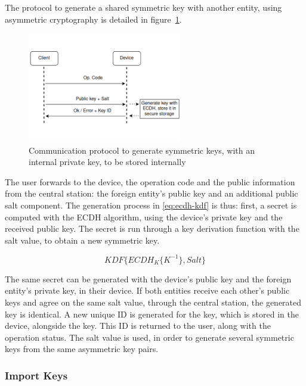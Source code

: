 The protocol to generate a shared symmetric key with another entity, using asymmetric cryptography is detailed in figure~\ref{fig:protocol:ecdh}.
\begin{figure}[h!]
	\centering
	\includegraphics[width=0.60\textwidth]{./Images/ecdh.png}
	\caption{Communication protocol to generate symmetric keys, with an internal private key, to be stored internally}
	\label{fig:protocol:ecdh}
\end{figure}

The user forwards to the device, the operation code and the public information from the central station: the foreign entity's public key and an additional public salt component.
The generation process in \ref{eq:ecdh-kdf} is thus: first, a secret is computed with the ECDH algorithm, using the device's private key and the received public key. The secret is run through a key derivation function with the salt value, to obtain a new symmetric key.

\begin{equation}
	\label{eq:ecdh-kdf}
	KDF\{ECDH_{K}\{K^{-1}\}, Salt\}
\end{equation}

The same secret can be generated with the device's public key and the foreign entity's private key, in their device. If both entities receive each other's public keys and agree on the same salt value, through the central station, the generated key is identical.
A new unique ID is generated for the key, which is stored in the device, alongside the key. This ID is returned to the user, along with the operation status.
The salt value is used, in order to generate several symmetric keys from the same asymmetric key pairs.

\subsubsection{Import Keys}\label{chap:arch:services:new-comms:import}

